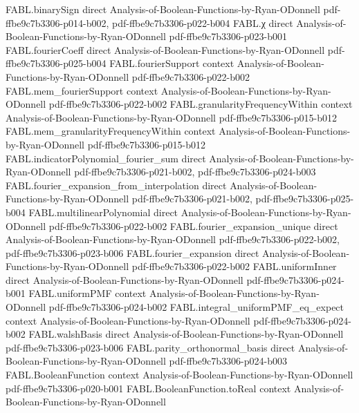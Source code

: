 \begin{theorem}
\proofstep
  {FABL.binarySign}
  {direct}
  {Analysis-of-Boolean-Functions-by-Ryan-ODonnell}
  {pdf-ffbe9c7b3306-p014-b002,
    pdf-ffbe9c7b3306-p022-b004}
\proofstep
  {FABL.χ}
  {direct}
  {Analysis-of-Boolean-Functions-by-Ryan-ODonnell}
  {pdf-ffbe9c7b3306-p023-b001}
\proofstep
  {FABL.fourierCoeff}
  {direct}
  {Analysis-of-Boolean-Functions-by-Ryan-ODonnell}
  {pdf-ffbe9c7b3306-p025-b004}
\proofstep
  {FABL.fourierSupport}
  {context}
  {Analysis-of-Boolean-Functions-by-Ryan-ODonnell}
  {pdf-ffbe9c7b3306-p022-b002}
\proofstep
  {FABL.mem_fourierSupport}
  {context}
  {Analysis-of-Boolean-Functions-by-Ryan-ODonnell}
  {pdf-ffbe9c7b3306-p022-b002}
\proofstep
  {FABL.granularityFrequencyWithin}
  {context}
  {Analysis-of-Boolean-Functions-by-Ryan-ODonnell}
  {pdf-ffbe9c7b3306-p015-b012}
\proofstep
  {FABL.mem_granularityFrequencyWithin}
  {context}
  {Analysis-of-Boolean-Functions-by-Ryan-ODonnell}
  {pdf-ffbe9c7b3306-p015-b012}
\proofstep
  {FABL.indicatorPolynomial_fourier_sum}
  {direct}
  {Analysis-of-Boolean-Functions-by-Ryan-ODonnell}
  {pdf-ffbe9c7b3306-p021-b002,
    pdf-ffbe9c7b3306-p024-b003}
\proofstep
  {FABL.fourier_expansion_from_interpolation}
  {direct}
  {Analysis-of-Boolean-Functions-by-Ryan-ODonnell}
  {pdf-ffbe9c7b3306-p021-b002,
    pdf-ffbe9c7b3306-p025-b004}
\proofstep
  {FABL.multilinearPolynomial}
  {direct}
  {Analysis-of-Boolean-Functions-by-Ryan-ODonnell}
  {pdf-ffbe9c7b3306-p022-b002}
\proofstep
  {FABL.fourier_expansion_unique}
  {direct}
  {Analysis-of-Boolean-Functions-by-Ryan-ODonnell}
  {pdf-ffbe9c7b3306-p022-b002,
    pdf-ffbe9c7b3306-p023-b006}
\proofstep
  {FABL.fourier_expansion}
  {direct}
  {Analysis-of-Boolean-Functions-by-Ryan-ODonnell}
  {pdf-ffbe9c7b3306-p022-b002}
\proofstep
  {FABL.uniformInner}
  {direct}
  {Analysis-of-Boolean-Functions-by-Ryan-ODonnell}
  {pdf-ffbe9c7b3306-p024-b001}
\proofstep
  {FABL.uniformPMF}
  {context}
  {Analysis-of-Boolean-Functions-by-Ryan-ODonnell}
  {pdf-ffbe9c7b3306-p024-b002}
\proofstep
  {FABL.integral_uniformPMF_eq_expect}
  {context}
  {Analysis-of-Boolean-Functions-by-Ryan-ODonnell}
  {pdf-ffbe9c7b3306-p024-b002}
\proofstep
  {FABL.walshBasis}
  {direct}
  {Analysis-of-Boolean-Functions-by-Ryan-ODonnell}
  {pdf-ffbe9c7b3306-p023-b006}
\proofstep
  {FABL.parity_orthonormal_basis}
  {direct}
  {Analysis-of-Boolean-Functions-by-Ryan-ODonnell}
  {pdf-ffbe9c7b3306-p024-b003}
\proofstep
  {FABL.BooleanFunction}
  {context}
  {Analysis-of-Boolean-Functions-by-Ryan-ODonnell}
  {pdf-ffbe9c7b3306-p020-b001}
\proofstep
  {FABL.BooleanFunction.toReal}
  {context}
  {Analysis-of-Boolean-Functions-by-Ryan-ODonnell}

\end{theorem}
